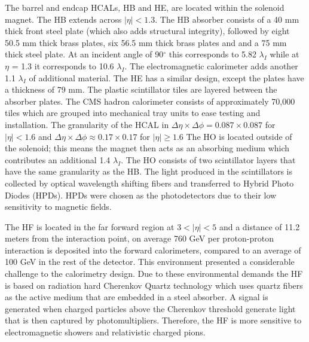 The barrel and endcap HCALs, HB and HE, are located within the 
solenoid magnet. The HB extends across $|\eta|<1.3$.
The HB absorber consists of a 40 mm thick front steel plate (which also adds structural integrity),
followed by eight 50.5 mm thick brass plates, six 56.5 mm thick brass plates and
and a 75 mm thick steel plate. At an incident angle of 90$^{\circ}$ this corresponds 
to 5.82 $\lambda_{I}$ while at $\eta$ = 1.3 it corresponds to 10.6 $\lambda_{I}$.
The electromagnetic calorimeter adds another 1.1 $\lambda_{I}$ of additional
material. The HE has a similar design, except the plates have a thickness of 79 mm.
The plastic scintillator tiles are layered between the absorber plates. The
CMS hadron calorimeter consists of approximately 70,000 tiles which are grouped
into mechanical tray units to ease testing and installation.  
The granularity of the HCAL in $\Delta\eta \times \Delta\phi = 0.087 \times 0.087$
for $|\eta|<1.6$ and $\Delta\eta \times \Delta\phi \approx 0.17 \times 0.17$ for $|\eta|\ge1.6$
The HO is located outside of the solenoid; this means the magnet then acts as an absorbing
medium which contributes an additional 1.4 $\lambda_{I}$. The HO consists of two 
scintillator layers that have the same granularity as the HB. 
The light produced in the scintillators is collected by optical wavelength shifting fibers 
and transferred to Hybrid Photo Diodes (HPDs). HPDs were chosen as the photodetectors
due to their low sensitivity to magnetic fields. %

The HF is located in the far forward region at $3<|\eta|<5$ and a distance
of  11.2 meters from the interaction point, on average 760 GeV per 
proton-proton interaction is deposited into the forward calorimeters, compared
to an average of 100 GeV in the rest of the detector. This environment
presented a considerable challenge to the calorimetry design. Due to these 
environmental demands the HF is based on radiation hard Cherenkov Quartz technology
which uses quartz fibers as the active medium that are embedded in a steel absorber. 
A signal is generated when charged particles above the Cherenkov threshold %
generate light that is then captured by photomultipliers. Therefore, the HF is
more sensitive to electromagnetic showers and relativistic charged pions.
